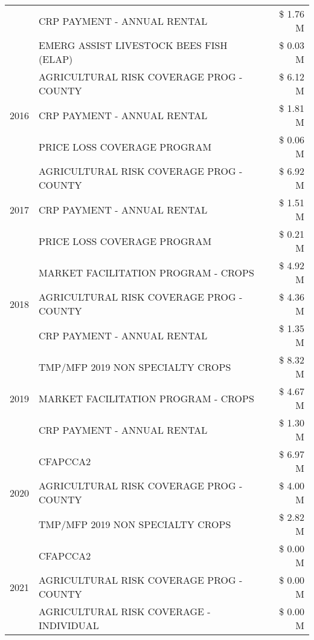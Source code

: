 \begin{tabular}{llr}
 & CRP PAYMENT - ANNUAL RENTAL & \$ 1.76 M \\
 & EMERG ASSIST LIVESTOCK BEES FISH (ELAP) & \$ 0.03 M \\
\cline{1-3}
\multirow[t]{3}{*}{2016} & AGRICULTURAL RISK COVERAGE PROG - COUNTY & \$ 6.12 M \\
 & CRP PAYMENT - ANNUAL RENTAL & \$ 1.81 M \\
 & PRICE LOSS COVERAGE PROGRAM & \$ 0.06 M \\
\cline{1-3}
\multirow[t]{3}{*}{2017} & AGRICULTURAL RISK COVERAGE PROG - COUNTY & \$ 6.92 M \\
 & CRP PAYMENT - ANNUAL RENTAL & \$ 1.51 M \\
 & PRICE LOSS COVERAGE PROGRAM & \$ 0.21 M \\
\cline{1-3}
\multirow[t]{3}{*}{2018} & MARKET FACILITATION PROGRAM - CROPS & \$ 4.92 M \\
 & AGRICULTURAL RISK COVERAGE PROG - COUNTY & \$ 4.36 M \\
 & CRP PAYMENT - ANNUAL RENTAL & \$ 1.35 M \\
\cline{1-3}
\multirow[t]{3}{*}{2019} & TMP/MFP 2019 NON SPECIALTY CROPS & \$ 8.32 M \\
 & MARKET FACILITATION PROGRAM - CROPS & \$ 4.67 M \\
 & CRP PAYMENT - ANNUAL RENTAL & \$ 1.30 M \\
\cline{1-3}
\multirow[t]{3}{*}{2020} & CFAPCCA2 & \$ 6.97 M \\
 & AGRICULTURAL RISK COVERAGE PROG - COUNTY & \$ 4.00 M \\
 & TMP/MFP 2019 NON SPECIALTY CROPS & \$ 2.82 M \\
\cline{1-3}
\multirow[t]{3}{*}{2021} & CFAPCCA2 & \$ 0.00 M \\
 & AGRICULTURAL RISK COVERAGE PROG - COUNTY & \$ 0.00 M \\
 & AGRICULTURAL RISK COVERAGE - INDIVIDUAL & \$ 0.00 M \\
\cline{1-3}
\bottomrule
\end{tabular}
